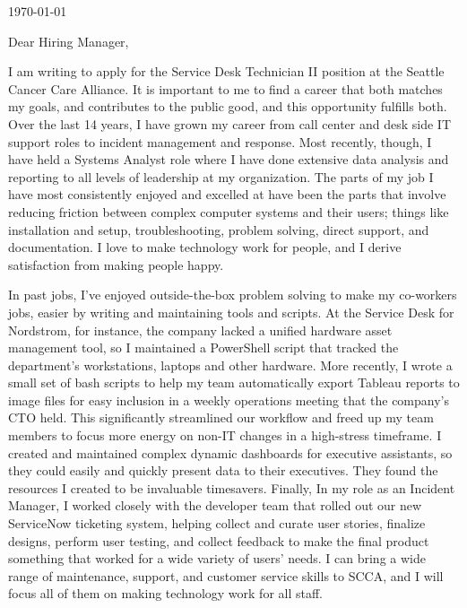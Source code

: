 \documentclass[10pt,oneside]{article}
\begin{document}
\hfill\dte\today
\heading
\vspace{\baselineskip}
\vspace{\baselineskip}

Dear Hiring Manager,

\vspace{\baselineskip}

I am writing to apply for the Service Desk Technician II position at the Seattle Cancer Care Alliance. It is important to me to find a career that both matches my goals, and contributes to the public good, and this opportunity fulfills both. Over the last 14 years, I have grown my career from call center and desk side IT support roles to incident management and response. Most recently, though, I have held a Systems Analyst role where I have done extensive data analysis and reporting to all levels of leadership at my organization. The parts of my job I have most consistently enjoyed and excelled at have been the parts that involve reducing friction between complex computer systems and their users; things like installation and setup, troubleshooting, problem solving, direct support, and documentation. I love to make technology work for people, and I derive satisfaction from making people happy.

\vspace{\baselineskip}

In past jobs, I’ve enjoyed outside-the-box problem solving to make my co-workers jobs, easier by writing and maintaining tools and scripts. At the Service Desk for Nordstrom, for instance, the company lacked a unified hardware asset management tool, so I maintained a PowerShell script that tracked the department’s workstations, laptops and other hardware. More recently, I wrote a small set of bash scripts to help my team automatically export Tableau reports to image files for easy inclusion in a weekly operations meeting that the company’s CTO held. This significantly streamlined our workflow and freed up my team members to focus more energy on non-IT changes in a high-stress timeframe. I created and maintained complex dynamic dashboards for executive assistants, so they could easily and quickly present data to their executives. They found the resources I created to be invaluable timesavers. Finally, In my role as an Incident Manager, I worked closely with the developer team that rolled out our new ServiceNow ticketing system, helping collect and curate user stories, finalize designs, perform user testing, and collect feedback to make the final product something that worked for a wide variety of users' needs. I can bring a wide range of maintenance, support, and customer service skills to SCCA, and I will focus all of them on making technology work for all staff.
\end{document}
